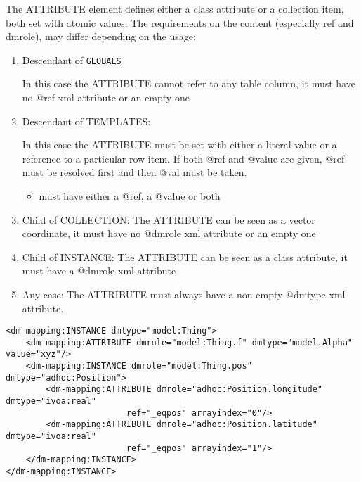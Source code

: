 
The ATTRIBUTE element defines either a class attribute or a collection item, both set with atomic values.
The requirements on
the content (especially ref and dmrole), may differ depending on
the usage:


\begin{enumerate}
\item Descendant of \texttt{GLOBALS}

  In this case the ATTRIBUTE cannot refer to any table column, it must have no @ref xml attribute or an empty one 
  
\item Descendant of TEMPLATES:

  In this case the ATTRIBUTE must be set with either a literal value or a reference to a particular row item. 
   If both @ref and @value are given, @ref must be resolved first and then @val must be taken. 

  \begin{itemize}
     \item must have either a @ref, a @value or both 
  \end{itemize}  

\item Child of COLLECTION:
    The ATTRIBUTE can be seen as a vector coordinate, 
    it must have  no @dmrole xml attribute or an empty one
    
\item Child of INSTANCE: 
    The ATTRIBUTE can be seen as a class attribute, 
    it must have a @dmrole xml attribute
           
\item Any case:     
    The ATTRIBUTE must always have a non empty @dmtype xml attribute.
\end{enumerate}  
    
    
\begin{lstlisting}[frame=single,caption={ATTRIBUTE examples},style=XML,basicstyle=\tiny]
<dm-mapping:INSTANCE dmtype="model:Thing">
    <dm-mapping:ATTRIBUTE dmrole="model:Thing.f" dmtype="model.Alpha" value="xyz"/>		
    <dm-mapping:INSTANCE dmrole="model:Thing.pos" dmtype="adhoc:Position">
        <dm-mapping:ATTRIBUTE dmrole="adhoc:Position.longitude" dmtype="ivoa:real" 
                        ref="_eqpos" arrayindex="0"/>
        <dm-mapping:ATTRIBUTE dmrole="adhoc:Position.latitude" dmtype="ivoa:real" 
                        ref="_eqpos" arrayindex="1"/>
    </dm-mapping:INSTANCE>
</dm-mapping:INSTANCE>
\end{lstlisting}  



